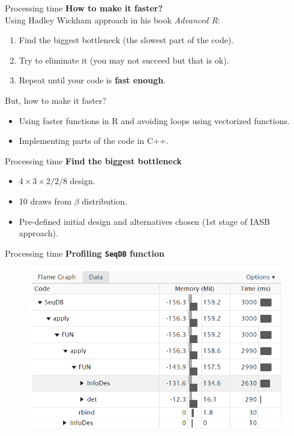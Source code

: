 \documentclass[11pt,t]{beamer}
\begin{document}
\begin{frame}[fragile]{Processing time}
	\textbf{How to make it faster?}\\
	Using Hadley Wickham approach in his book \textit{Advanced R}:
	\begin{enumerate}
		\item Find the biggest bottleneck (the slowest part of the code).
		\item Try to eliminate it (you may not succeed but that is ok).
		\item Repeat until your code is \textbf{fast enough}.
	\end{enumerate}
	
	\begin{block}{But, how to make it faster?}
	\begin{itemize}
		\item Using faster functions in R and avoiding loops using vectorized functions.
		\item Implementing parts of the code in C++.
	\end{itemize}		
	\end{block}
\end{frame}

\begin{frame}[fragile]{Processing time}
	\textbf{Find the biggest bottleneck}
	\begin{itemize}
		\item $4 \times 3 \times 2/2/8$ design.
		\item 10 draws from $\beta$ distribution.
		\item Pre-defined initial design and alternatives chosen (1st stage of IASB approach).
	\end{itemize}
\end{frame}

\begin{frame}[fragile]{Processing time}
\textbf{Profiling \texttt{SeqDB} function}
\begin{figure}
			\includegraphics[scale = .7]{mygraphics/Profiling1.png}
		\end{figure}
\end{frame}
\end{document}
